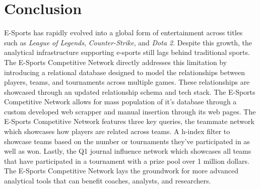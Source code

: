 \documentclass[sigconf]{acmart}
\begin{document}
\section{Conclusion}
E-Sports has rapidly evolved into a global form of entertainment across titles such as \textit{League of Legends}, \textit{Counter-Strike}, and \textit{Dota 2}. Despite this growth, the analytical infrastructure supporting e-sports still lags behind traditional sports. The E-Sports Competitive Network directly addresses this limitation by introducing a relational database designed to model the relationships between players, teams, and tournaments across multiple games. These relationships are showcased through an updated relationship schema and tech stack. The E-Sports Competitive Network allows for mass population of it's database through a custom developed web scrapper and manual insertion through its web pages. The E-Sports Competitive Network features three key queries, the teammate network which showcases how players are related across teams. A h-index filter to showcase teams based on the number or tournaments they've participated in as well as won. Lastly, the Q1 journal influence network which showcases all teams that have participated in a tournament with a prize pool over 1 million dollars. The E-Sports Competitive Network lays the groundwork for more advanced analytical tools that can benefit coaches, analysts, and researchers.


\cite{Shannon2003Cytoscape}
\cite{playwright_python}
\end{document}
